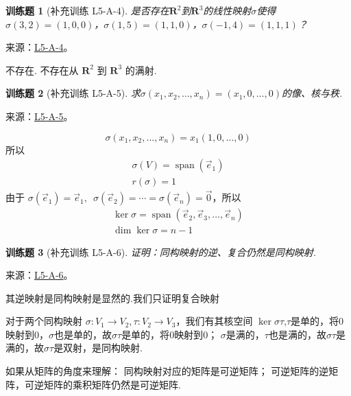 \documentclass[UTF8,12pt,a4paper,fontset=fandol]{ctexart}
\newtheorem{exercise}{训练题}[section]
\begin{document}
\begin{exercise}[补充训练 L5-A-4]\label{prob:L5-A-4}
是否存在$\mathbf{R}^2$到$\mathbf{R}^3$的线性映射$\sigma$使得$\sigma(3,2)=(1,0,0)$，$\sigma(1,5)=(1,1,0)$，$\sigma(-1,4)=(1,1,1)$？
\end{exercise}
\noindent 来源：\href{https://github.com/yhwu-is/Linear-Algebra-Left-Undone/blob/new/%E8%AE%B2%E4%B9%89/%E4%B8%93%E9%A2%98/5%20%E7%BA%BF%E6%80%A7%E6%98%A0%E5%B0%84.tex}{L5-A-4}。
\begin{solve}
不存在. 不存在从 $ \mathbf{R}^2 $ 到 $ \mathbf{R}^3 $ 的满射.
\end{solve}

\begin{exercise}[补充训练 L5-A-5]\label{prob:L5-A-5}
求$\sigma(x_1,x_2,\ldots,x_n)=(x_1,0,\ldots,0)$的像、核与秩.
\end{exercise}
\noindent 来源：\href{https://github.com/yhwu-is/Linear-Algebra-Left-Undone/blob/new/%E8%AE%B2%E4%B9%89/%E4%B8%93%E9%A2%98/5%20%E7%BA%BF%E6%80%A7%E6%98%A0%E5%B0%84.tex}{L5-A-5}。
\begin{solve}
\[ \sigma(x_1, x_2, \ldots, x_n) = x_1(1, 0, \ldots, 0) \]
          所以
          \begin{gather*}
              \sigma(V) = \operatorname{span}(\vec{e}_1) \\
              r(\sigma) = 1
          \end{gather*}
          由于 $ \sigma(\vec{e}_1) = \vec{e}_1,\enspace \sigma(\vec{e}_2) = \cdots = \sigma(\vec{e}_n) = \vec{0} $，所以
          \begin{gather*}
              \ker \sigma = \operatorname{span}(\vec{e}_2, \vec{e}_3, \ldots, \vec{e}_n) \\
              \dim \ker \sigma = n - 1
          \end{gather*}
\end{solve}

\begin{exercise}[补充训练 L5-A-6]\label{prob:L5-A-6}
证明：同构映射的逆、复合仍然是同构映射.
\end{exercise}
\noindent 来源：\href{https://github.com/yhwu-is/Linear-Algebra-Left-Undone/blob/new/%E8%AE%B2%E4%B9%89/%E4%B8%93%E9%A2%98/5%20%E7%BA%BF%E6%80%A7%E6%98%A0%E5%B0%84.tex}{L5-A-6}。
\begin{solve}
其逆映射是同构映射是显然的.我们只证明复合映射

            对于两个同构映射 $\sigma: V_1 \to V_2, \tau: V_2 \to V_3$，我们有其核空间
            $\ker \sigma \tau$,$\tau$是单的，将$0$映射到$0$，$\sigma$也是单的，故$\sigma\tau$是单的，将$0$映射到$0$；
            $\sigma$是满的，$\tau$也是满的，故$\sigma\tau$是满的，故$\sigma\tau$是双射，是同构映射.


            如果从矩阵的角度来理解：
            同构映射对应的矩阵是可逆矩阵；
            可逆矩阵的逆矩阵，可逆矩阵的乘积矩阵仍然是可逆矩阵.
\end{solve}
\end{document}
